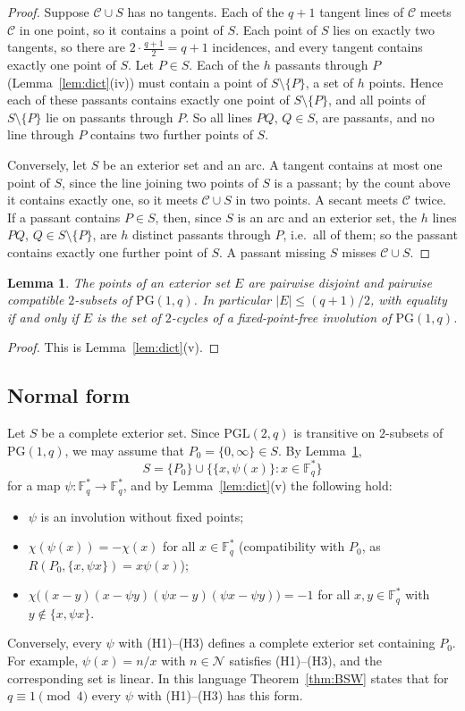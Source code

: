 \documentclass[11pt]{amsart}
\newtheorem{lemma}[theorem]{Lemma}
\theoremstyle{definition}
\theoremstyle{remark}
\numberwithin{equation}{section}
\newcommand{\Fs}{\mathbb{F}_q^{*}}
\newcommand{\PGone}{\mathrm{PG}(1,q)}
\newcommand{\PGL}{\mathrm{PGL}(2,q)}
\newcommand{\Ns}{\mathcal{N}}
\newcommand{\Con}{\mathcal{C}}
\begin{document}
\begin{proof}
Suppose $\Con\cup S$ has no tangents. Each of the $q+1$ tangent lines of $\Con$ meets $\Con$ in one point, so it contains a point
of $S$. Each point of $S$ lies on exactly two tangents, so there are $2\cdot\frac{q+1}2=q+1$ incidences, and every tangent
contains exactly one point of $S$. Let $P\in S$. Each of the $h$ passants through $P$ (Lemma~\ref{lem:dict}(iv)) must contain a
point of $S\setminus\{P\}$, a set of $h$ points. Hence each of these passants contains exactly one point of $S\setminus\{P\}$,
and all points of $S\setminus\{P\}$ lie on passants through $P$. So all lines $PQ$, $Q\in S$, are passants, and no line through
$P$ contains two further points of $S$.

Conversely, let $S$ be an exterior set and an arc. A tangent contains at most one point of $S$, since the line joining two
points of $S$ is a passant; by the count above it contains exactly one, so it meets $\Con\cup S$ in two points. A secant meets
$\Con$ twice. If a passant contains $P\in S$, then, since $S$ is an arc and an exterior set, the $h$ lines $PQ$, $Q\in
S\setminus\{P\}$, are $h$ distinct passants through $P$, i.e.\ all of them; so the passant contains exactly one further point of
$S$. A passant missing $S$ misses $\Con\cup S$.
\end{proof}

\begin{lemma}\label{lem:pairs}
The points of an exterior set $E$ are pairwise disjoint and pairwise compatible $2$-subsets of $\PGone$. In particular
$|E|\le(q+1)/2$, with equality if and only if $E$ is the set of $2$-cycles of a fixed-point-free involution of $\PGone$.
\end{lemma}
\begin{proof}
This is Lemma~\ref{lem:dict}(v).
\end{proof}

\subsection{Normal form}
Let $S$ be a complete exterior set. Since $\PGL$ is transitive on $2$-subsets of $\PGone$, we may assume that
$P_0=\{0,\infty\}\in S$. By Lemma~\ref{lem:pairs},
\[
S=\{P_0\}\cup\bigl\{\{x,\psi(x)\}:x\in\Fs\bigr\}
\]
for a map $\psi\colon\Fs\to\Fs$, and by Lemma~\ref{lem:dict}(v) the following hold:
\begin{itemize}
\item[(H1)] $\psi$ is an involution without fixed points;
\item[(H2)] $\chi(\psi(x))=-\chi(x)$ for all $x\in\Fs$ (compatibility with $P_0$, as $R(P_0,\{x,\psi x\})=x\psi(x)$);
\item[(H3)] $\chi\bigl((x-y)(x-\psi y)(\psi x-y)(\psi x-\psi y)\bigr)=-1$ for all $x,y\in\Fs$ with $y\notin\{x,\psi x\}$.
\end{itemize}
Conversely, every $\psi$ with (H1)--(H3) defines a complete exterior set containing $P_0$. For example, $\psi(x)=n/x$ with
$n\in\Ns$ satisfies (H1)--(H3), and the corresponding set is linear. In this language Theorem~\ref{thm:BSW} states that for
$q\equiv1\pmod 4$ every $\psi$ with (H1)--(H3) has this form.
\end{document}
